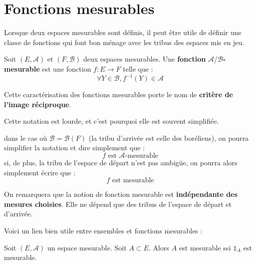 \documentclass[../integ-proba.tex]{subfiles}
\begin{document}
\section{Fonctions mesurables}

Lorsque deux espaces mesurables sont définis, il peut être utile de définir une classe de fonctions qui font bon ménage avec les tribus des espaces mis en jeu.

\begin{defi}
  Soit $\left(E, \mathcal{A}\right)$ et $\left(F, \mathcal{B}\right)$ deux espaces mesurables.
  Une \textbf{fonction } $\mathcal{A}$/$\mathcal{B}$\textbf{-mesurable} est une fonction $f : E \longrightarrow F$ telle que :
  $$ \forall Y \in \mathcal{B}, f^{-1}(Y) \in \mathcal{A} $$
\end{defi}

\begin{rem}
  Cette caractérisation des fonctions mesurables porte le nom de \textbf{critère de l'image réciproque}.
\end{rem}

\begin{rem}
  \label{rem:simplification_notation_fonctions_mesurables}
  Cette notation est lourde, et c'est pourquoi elle est souvent simplifiée.
  \begin{itemize}
  \itemb dans le cas où $\mathcal{B}=\mathcal{B}\left(F\right)$ (la tribu d'arrivée est celle des boréliens), on pourra simplifier la notation et dire simplement que :
  $$
  f \text{ est } \mathcal{A}\text{-mesurable}
  $$
  \itemb si, de plus, la tribu de l'espace de départ n'est pas ambigüe, on pourra alors simplement écrire que :
  $$
  f \text{ est mesurable}
  $$
  \end{itemize}
\end{rem}

\begin{rem}
  On remarquera que la notion de fonction mesurable est \textbf{indépendante des mesures choisies}.
  Elle ne dépend que des tribus de l'espace de départ et d'arrivée.
\end{rem}

Voici un lien bien utile entre ensembles et fonctions mesurables :

\begin{prop}
  \label{prop:lienensfctmes}
  Soit $\left(E, \mathcal{A}\right)$ un espace mesurable.
  Soit $A\subset E$.
  Alors $A$ est mesurable ssi $\mathds{1}_A$ est mesurable.
\end{prop}
\end{document}
